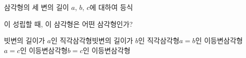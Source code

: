 삼각형의 세 변의 길이 $a$, $b$, $c$에 대하여 등식\par\smallskip{}\par\smallskip\noindent 이 성립할 때, 이 삼각형은 어떤 삼각형인가?
\begin{choicesv}{빗변의 길이가 $a$인 직각삼각형}{빗변의 길이가 $b$인 직각삼각형}{$a=b$인 이등변삼각형}{$a=c$인 이등변삼각형}{$b=c$인 이등변삼각형}\end{choicesv}
